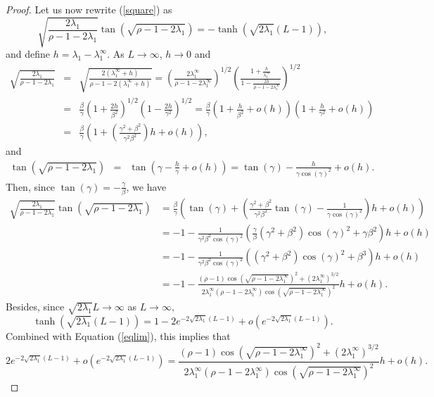 \documentclass[11pt]{article}
\theoremstyle{plain}
\newcommand\linf{\lambda_1^\infty}
\begin{document}
\begin{proof}
 Let us now rewrite (\ref{square}) as
\begin{equation}
\sqrt{\frac{2\lambda_1}{\rho-1-2\lambda_1}}\tan\left(\sqrt{\rho-1-2\lambda_1}\right)=-\tanh\left(\sqrt{2\lambda_1}(L-1)\right),\label{eq:sqr:2}
\end{equation}
and define $h=\lambda_1-\linf.$ As $L\to\infty$, $h\to0$ and
\begin{eqnarray*}
\sqrt{\frac{2\lambda_1}{\rho-1-2\lambda_1}}&=&\sqrt{\frac{2(\linf+h)}{\rho-1-2(\linf+h)}}=\left(\frac{2\linf}{\rho-1-2\linf}\right)^{1/2}\left(\frac{1+\frac{h}{\linf}}{1-\frac{2h}{\rho-1-2\linf}}\right)^{1/2}\\
&=&\frac{\beta}{\gamma}\left(1+\frac{2h}{\beta^2}\right)^{1/2}\left(1-\frac{2h}{\gamma^2}\right)^{1/2}=\frac{\beta}{\gamma}\left(1+\frac{h}{\beta^2}+o(h)\right)\left(1+\frac{h}{\gamma^2}+o(h)\right)\\
&=& \frac{\beta}{\gamma}\left(1+\left(\frac{\gamma^2+\beta^2}{\gamma^2\beta^2}\right)h+o(h)\right),
\end{eqnarray*} and
\begin{eqnarray*}
\tan(\sqrt{\rho-1-2\lambda_1})&=&\tan\left(\gamma-\frac{h}{\gamma}+o(h)\right)=\tan(\gamma)-\frac{h}{\gamma\cos(\gamma)^2}+o(h).
\end{eqnarray*} Then, since $\tan(\gamma)=-\frac{\gamma}{\beta}$, we have
\begin{align*}
\sqrt{\frac{2\lambda_1}{\rho-1-2\lambda_1}}\tan(\sqrt{\rho-1-2\lambda_1})&=\frac{\beta}{\gamma}\left(\tan(\gamma)+\left(\frac{\gamma^2+\beta^2}{\gamma^2\beta^2}\tan(\gamma)-\frac{1}{\gamma\cos(\gamma)^2}\right)h+o(h)\right)\\
&=-1-\frac{1}{\gamma^2\beta^2\cos(\gamma)^2}\left(\frac{\gamma}{\beta}(\gamma^2+\beta^2)\cos(\gamma)^2+\gamma\beta^2\right)h+o(h)\\
&=-1-\frac{1}{\gamma^2\beta^2\cos(\gamma)^2}\left((\gamma^2+\beta^2)\cos(\gamma)^2+\beta^3\right)h+o(h)\\
&=-1-\frac{(\rho-1)\cos(\sqrt{\rho-1-2\linf})^2+(2\linf)^{3/2}}{2\linf(\rho-1-2\linf)\cos(\sqrt{\rho-1-2\linf})^2}h+o(h).
\end{align*}
Besides, since $\sqrt{2\lambda_1}L\to \infty$ as $L\to\infty,$ 
\begin{equation*}
\tanh(\sqrt{2\lambda_1}(L-1))=1-2e^{-2\sqrt{2\lambda_1}(L-1)}+o(e^{-2\sqrt{2\lambda_1}(L-1)}).
\end{equation*} 
Combined with Equation (\ref{eqlim}), this implies that
\begin{equation}\label{eq:dl:1}
2e^{-2\sqrt{2\lambda_1}(L-1)}+o(e^{-2\sqrt{2\lambda_1}(L-1)})=\frac{(\rho-1)\cos(\sqrt{\rho-1-2\linf})^2+(2\linf)^{3/2}}{2\linf(\rho-1-2\linf)\cos(\sqrt{\rho-1-2\linf})^2}h+o(h).

\end{equation}
\end{proof}
\end{document}

